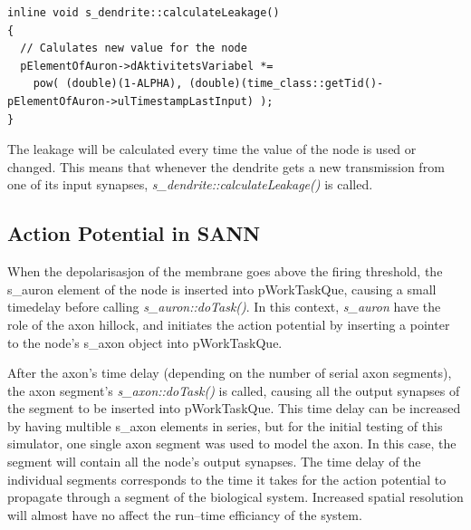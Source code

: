 
\begin{lstlisting}
inline void s_dendrite::calculateLeakage()
{ 
  // Calulates new value for the node
  pElementOfAuron->dAktivitetsVariabel *= 
    pow( (double)(1-ALPHA), (double)(time_class::getTid()-pElementOfAuron->ulTimestampLastInput) );
}
\end{lstlisting}

	The leakage will be calculated every time the value of the node is used or changed.
	This means that whenever the dendrite gets a new transmission from one of its input synapses, \emph{s\_dendrite::calculateLeakage()} is called.

	\subsection{Action Potential in SANN}
	\label{ssecSANNAP}
	When the depolarisasjon of the membrane goes above the firing threshold, the s\_auron element of the node is inserted into pWorkTaskQue, causing a small timedelay before calling \emph{s\_auron::doTask()}.
	In this context, \emph{s\_auron} have the role of the axon hillock, and initiates the action potential by inserting a pointer to the node's s\_axon object into pWorkTaskQue.

	After the axon's time delay (depending on the number of serial axon segments), the axon segment's \emph{s\_axon::doTask()} is called, 
																			causing all the output synapses of the segment to be inserted into pWorkTaskQue.
	This time delay can be increased by having multible s\_axon elements in series, but for the initial testing of this simulator, one single axon segment was used to model the axon.
	In this case, the segment will contain all the node's output synapses.
	The time delay of the individual segments corresponds to the time it takes for the action potential to propagate through a segment of the biological system.
	Increased spatial resolution will almost have no affect the run--time efficiancy of the system. %

